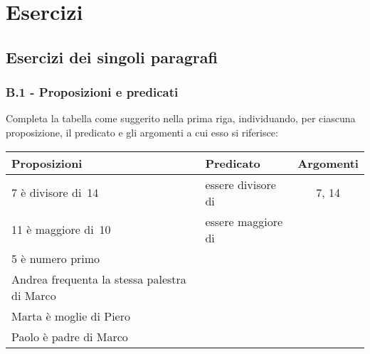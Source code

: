 \section{Esercizi}
\subsection{Esercizi dei singoli paragrafi}
\subsubsection*{B.1 - Proposizioni e predicati}

\begin{esercizio}
\label{ese:B.1}
Completa la tabella come suggerito nella prima riga, individuando, per ciascuna proposizione, il predicato e gli argomenti a cui esso si riferisce:
\begin{center}
\begin{tabular}{llc}
\toprule
Proposizioni & Predicato & Argomenti\\
\midrule
7 è divisore di~14 & essere divisore di & 7, 14 \\
11 è maggiore di~10 & essere maggiore di & \\
5 è numero primo & & \\
Andrea frequenta la stessa palestra di Marco & & \\
Marta è moglie di Piero & & \\
Paolo è padre di Marco & & \\
\bottomrule
\end{tabular}
\end{center}
\end{esercizio}


